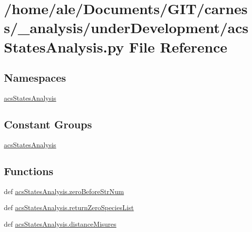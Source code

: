 \hypertarget{a00041}{\section{/home/ale/\-Documents/\-G\-I\-T/carness/\-\_\-analysis/under\-Development/acs\-States\-Analysis.py File Reference}
\label{a00041}
}
\subsection*{Namespaces}
\begin{DoxyCompactItemize}
\item 
\hyperlink{a00098}{acs\-States\-Analysis}
\end{DoxyCompactItemize}
\subsection*{Constant Groups}
\begin{DoxyCompactItemize}
\item 
\hyperlink{a00098}{acs\-States\-Analysis}
\end{DoxyCompactItemize}
\subsection*{Functions}
\begin{DoxyCompactItemize}
\item 
def \hyperlink{a00098_aeeb6d629132a9755b45a3008d445419c}{acs\-States\-Analysis.\-zero\-Before\-Str\-Num}
\item 
def \hyperlink{a00098_ad7c75c1e146fa51da42274cf7d5747d0}{acs\-States\-Analysis.\-return\-Zero\-Species\-List}
\item 
def \hyperlink{a00098_a76768d52780b1415a920dc94b3c991c0}{acs\-States\-Analysis.\-distance\-Misures}
\end{DoxyCompactItemize}
